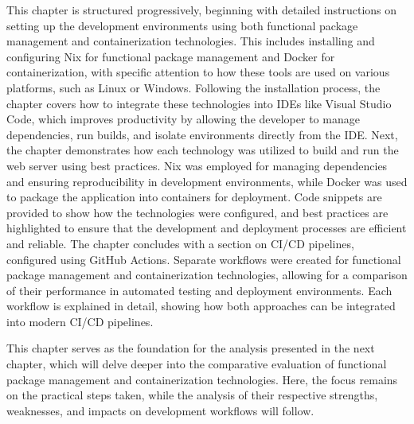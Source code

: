 This chapter is structured progressively, beginning with detailed instructions on
setting up the development environments using both functional package management and
containerization technologies. This includes installing and configuring Nix for functional
package management and Docker for containerization, with specific attention to how these
tools are used on various platforms, such as Linux or Windows.
Following the installation process, the chapter covers how to integrate these technologies
into IDEs like Visual Studio Code,
which improves productivity by allowing the developer to manage dependencies, run builds,
and isolate environments directly from the IDE.
Next, the chapter demonstrates how each technology was utilized to build and run the web
server using best practices. Nix was employed for managing dependencies and ensuring
reproducibility in development environments, while Docker was used to package the
application into containers for deployment. Code snippets are provided to show how the
technologies were configured, and best practices are highlighted to ensure that the
development and deployment processes are efficient and reliable.
The chapter concludes with a section on CI/CD pipelines,
configured using GitHub Actions. Separate workflows were created for
functional package management and containerization technologies, allowing for a comparison
of their performance in automated testing and deployment environments. Each workflow is
explained in detail, showing how both approaches can be integrated into modern CI/CD pipelines.

This chapter serves as the foundation for the analysis presented in the next chapter, which
will delve deeper into the comparative evaluation of functional package management and
containerization technologies. Here, the focus remains on the practical steps taken, while
the analysis of their respective strengths, weaknesses, and impacts on development workflows
will follow.






